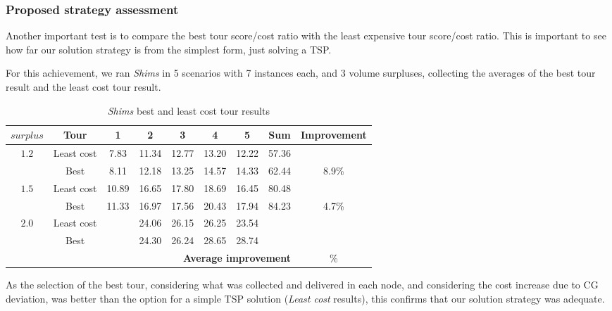 \documentclass[preprint]{elsarticle}
\begin{document}
{\color{blue}


\subsubsection{Proposed strategy assessment}

Another important test is to compare the best tour score/cost ratio with the least expensive tour score/cost ratio. This is important to see how far our solution strategy is from the simplest form, just solving a TSP.

For this achievement, we ran {\it Shims} in 5 scenarios with 7 instances each, and 3 volume surpluses, collecting the averages of the best tour result and the least cost tour result.

\begin{table}[H]
\centering
\caption{{\it Shims} best and least cost tour results}  \label{tab:20least}
\footnotesize
\begin{tabular}{ccccccccc}
\toprule
{$surplus$}              & {\bf Tour} & {\bf 1} & {\bf 2} & {\bf 3} & {\bf 4}  & {\bf 5}   & {\bf Sum} & {\bf Improvement}\\

\midrule[.1pt]	
\multirow{2}{*}{$1.2$}   & Least cost    & 7.83    & 11.34 & 12.77 & 13.20 & 12.22  & 57.36 &       \\ 
                         & Best          & 8.11    & 12.18 & 13.25 & 14.57 & 14.33  & 62.44 & 8.9\%  \\ 
\midrule[.1pt]	
\multirow{2}{*}{$1.5$}   & Least cost    & 10.89   & 16.65 & 17.80 & 18.69 & 16.45  & 80.48 & \\ 	
                         & Best          & 11.33   & 16.97 & 17.56 & 20.43 & 17.94  & 84.23 & 4.7\%  \\ 
\midrule[.1pt]	
\multirow{2}{*}{$2.0$}   & Least cost    &         & 24.06 & 26.15 & 26.25 & 23.54  &       &  \\ 
                         & Best          &         & 24.30 & 26.24 & 28.65 & 28.74  &       &  \\ 		                         
\midrule[.1pt]
 \multicolumn{8}{r}{{\bf Average improvement}}                                              & \% \\
\bottomrule
\end{tabular}
\normalsize
\end{table}

As the selection of the best tour, considering what was collected and delivered in each node, and considering the cost increase due to CG deviation, was better than the option for a simple TSP solution (\textit{Least cost} results), this confirms that our solution strategy was adequate.

}
\end{document}
